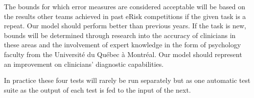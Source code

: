 \documentclass[12pt, titlepage]{article}
\begin{document}
 \label{bounds}

The bounds for which error measures are considered acceptable will be based on the results other teams achieved in past eRisk competitions if the given task is a repeat. Our model should perform better than previous years. If the task is new, bounds will be determined through research into the accuracy of clinicians in these areas and the involvement of expert knowledge in the form of psychology faculty from the Université du Québec à Montréal. Our model should represent an improvement on clinicians’ diagnostic capabilities.


In practice these four tests will rarely be run separately but as one automatic test suite as the output of each test is fed to the input of the next.
\end{document}
